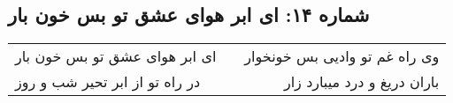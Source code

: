 \begin{center}
\section*{شماره ۱۴: ای ابر هوای عشق تو بس خون بار}
\label{sec:014}
\begin{longtable}{l p{0.5cm} r}
ای ابر هوای عشق تو بس خون بار
&&
وی راه غم تو وادیی بس خونخوار
\\
در راه تو از ابر تحیر شب و روز
&&
باران دریغ و درد میبارد زار
\\
\end{longtable}
\end{center}
